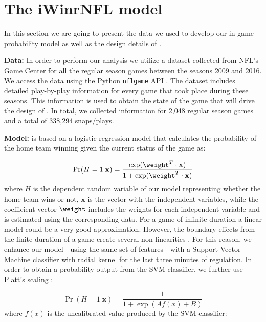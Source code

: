 \section{The \MakeLowercase{i}W\MakeLowercase{inr}NFL model}
\label{sec:model}

In this section we are going to present the data we used to develop our in-game probability model as well as the design details of {\method}. 

{\bf Data: }In order to perform our analysis we utilize a dataset collected from NFL's Game Center for all the regular season games between the seasons 2009 and 2016. 
We access the data using the Python {\tt nflgame} API \cite{nflgame}. 
The dataset includes detailed play-by-play information for every game that took place during these seasons. 
This information is used to obtain the state of the game that will drive the design of {\method}. 
In total, we collected information for 2,048 regular season games and a total of 338,294 snaps/plays. 

{\bf Model: }
{\method} is based on a logistic regression model that calculates the probability of the home team winning given the current status of the game as: 

\begin{equation}
\Pr(H=1| \mathbf{x})= \frac{\exp(\mathbf{\weight}^T\cdot\mathbf{x})}{1+\exp(\mathbf{\weight}^T\cdot\mathbf{x})}
\label{eq:reg}
\end{equation}
where $H$ is the dependent random variable of our model representing whether the home team wins or not, $\mathbf{x}$ is the vector with the independent variables, while the coefficient vector $\mathbf{\weight}$ includes the weights for each independent variable and is estimated using the corresponding data.  
For a game of infinite duration a linear model could be a very good approximation.  
However, the boundary effects from the finite duration of a game create several non-linearities \cite{winston2012mathletics}.  
For this reason, we enhance our model - using the same set of features - with a Support Vector Machine classifier with radial kernel for the last three minutes of regulation.  
In order to obtain a probability output from the SVM classifier, we further use Platt's scaling \cite{platt1999probabilistic}: 

\begin{equation}
\Pr(H=1| \mathbf{x})= \frac{1}{1+\exp{(Af(x)+B)}}
\label{eq:platt}
\end{equation}
where $f(x)$ is the uncalibrated value produced by the SVM classifier: 

